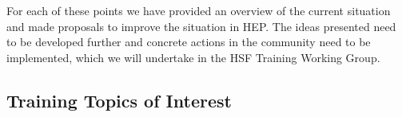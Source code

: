 \documentclass[12pt,a4paper]{article}
\begin{document}
For each of these points we have provided an overview of the current situation
and made proposals to improve the situation in HEP. The ideas presented need to
be developed further and concrete actions in the community need to be
implemented, which we will undertake in the HSF Training Working Group\cite{HSFTrainingWG}.


\newpage
\begin{appendices}

\sloppy
\raggedright

\hypertarget{appendix-a---training-topics-of-interest}{%
\section{Training Topics of Interest}\label{appendix-a---training-topics-of-interest}}


\end{appendices}
\end{document}

